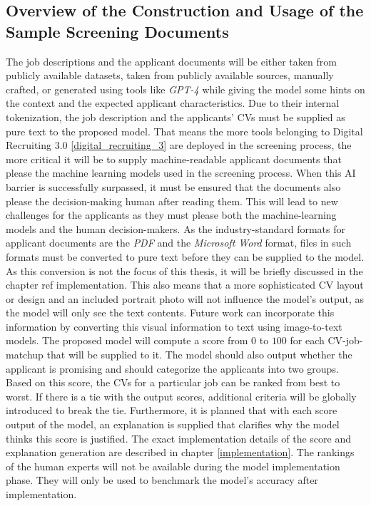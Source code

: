 \documentclass[draft,final]{thesisclass} %
\begin{document}
\subsection{Overview of the Construction and Usage of the Sample Screening Documents}
The job descriptions and the applicant documents will be either taken from publicly available datasets, taken from publicly available sources, manually crafted, or generated using tools like \textit{GPT-4} \parencite{gpt4} while giving the model some hints on the context and the expected applicant characteristics.
Due to their internal tokenization, the job description and the applicants' \acs{CV}s must be supplied as pure text to the proposed model.
That means the more tools belonging to Digital Recruiting 3.0 \ref{digital_recruiting_3} are deployed in the screening process, the more critical it will be to supply machine-readable applicant documents that please the machine learning models used in the screening process.
When this \acs{AI} barrier is successfully surpassed, it must be ensured that the documents also please the decision-making human after reading them.
This will lead to new challenges for the applicants as they must please both the machine-learning models and the human decision-makers.
As the industry-standard formats for applicant documents are the \textit{PDF} and the \textit{Microsoft Word} format, files in such formats must be converted to pure text before they can be supplied to the model.
As this conversion is not the focus of this thesis, it will be briefly discussed in the chapter ref {implementation}.
This also means that a more sophisticated \acs{CV} layout or design and an included portrait photo will not influence the model's output, as the model will only see the text contents.
Future work can incorporate this information by converting this visual information to text using image-to-text models.
The proposed model will compute a score from $0$ to $100$ for each \acs{CV}-job-matchup that will be supplied to it.
The model should also output whether the applicant is promising and should categorize the applicants into two groups.
Based on this score, the \acs{CV}s for a particular job can be ranked from best to worst.
If there is a tie with the output scores, additional criteria will be globally introduced to break the tie.
Furthermore, it is planned that with each score output of the model, an explanation is supplied that clarifies why the model thinks this score is justified.
The exact implementation details of the score and explanation generation are described in chapter \ref{implementation}.
The rankings of the human experts will not be available during the model implementation phase. They will only be used to benchmark the model's accuracy after implementation.
\end{document}
